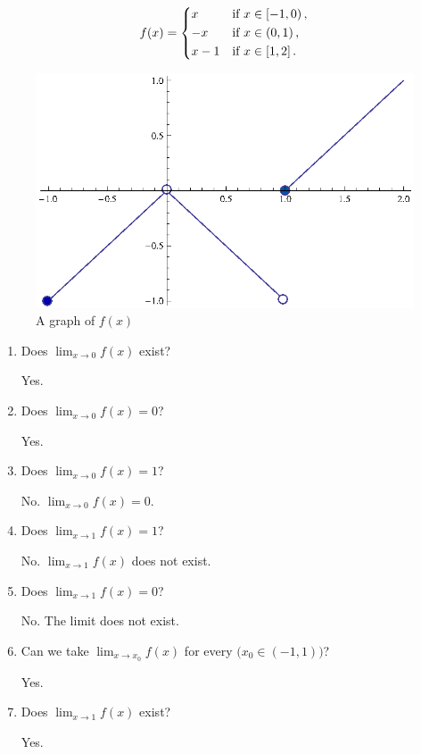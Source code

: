 \begin{ex}
  \[ f(x)=
    \begin{dcases}
      x &\text{if } x \in \left[ -1,0 \right), \\
      -x &\text{if } x \in \left (0,1 \right),  \\
      x-1 &\text{if } x \in \left[1, 2\right].
    \end{dcases}
  \]
  \begin{figure}[h]
    \begin{center}
      \includegraphics{graphs/pwlimex1}
    \end{center}
    \caption{A graph of \(f(x)\)}
    \label{fig:pwlimex1}
  \end{figure}
  \begin{enumerate}
    \item Does \( \lim_{x\to 0} f(x) \) exist?
      \begin{sol}
        Yes.
      \end{sol}
    \item Does \( \lim_{x \to 0} f(x)=0 \)?
      \begin{sol}
        Yes.
      \end{sol}
    \item Does \(\lim_{x \to 0} f(x)=1\)?
      \begin{sol}
        No. \(\lim_{x \to 0} f(x)=0\).
      \end{sol}
    \item Does \(\lim_{x \to 1} f(x)=1\)?
      \begin{sol}
        No. \( \lim_{x \to 1} f(x) \) does not exist.
      \end{sol}
    \item Does \(\lim_{x \to 1} f(x)=0\)?
      \begin{sol}
        No. The limit does not exist.
      \end{sol}
    \item Can we take \( \lim_{x \to x_0} f(x)\) for every \(\big(x_0 \in (-1, 1)\big)\)?
      \begin{sol}
        Yes.
      \end{sol}
    \item Does \( \lim_{x \to 1} f(x) \) exist?
      \begin{sol}
        Yes.
      \end{sol}
  \end{enumerate}
\end{ex}
